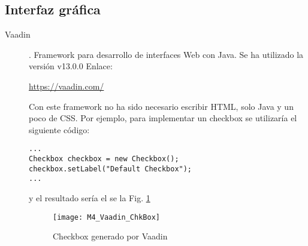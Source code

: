 \subsection{Interfaz gráfica}
\begin{description}
	\item[Vaadin]. Framework para desarrollo de interfaces Web con Java.
		Se ha utilizado la versión  v13.0.0 Enlace:
		
		\url{https://vaadin.com/}
		
		Con este framework no ha sido necesario escribir HTML, solo Java y un poco de CSS. Por ejemplo, para implementar un checkbox se utilizaría el siguiente código:
\begin{lstlisting}
...
Checkbox checkbox = new Checkbox();
checkbox.setLabel("Default Checkbox");
...
\end{lstlisting}
		y el resultado sería el se la Fig. \ref{fig:M4_Vaadin_ChkBox}
\begin{figure}[!h]
	\centering
	\texttt{[image: M4\_Vaadin\_ChkBox]}
	\caption{Checkbox generado por Vaadin}\label{fig:M4_Vaadin_ChkBox}
\end{figure}
\FloatBarrier

\end{description}

